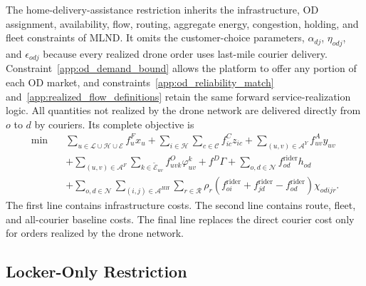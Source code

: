 \documentclass[final,3p,authoryear]{elsarticle}
\begin{document}
The home-delivery-assistance restriction inherits the infrastructure, OD assignment, availability, flow, routing, aggregate energy, congestion, holding, and fleet constraints of MLND.
It omits the customer-choice parameters, $\alpha_{dj}$, $\eta_{odj}$, and $\epsilon_{odj}$ because every realized drone order uses last-mile courier delivery.
Constraint~\eqref{app:od_demand_bound} allows the platform to offer any portion of each OD market, and constraints~\eqref{app:od_reliability_match} and~\eqref{app:realized_flow_definitions} retain the same forward service-realization logic.
All quantities not realized by the drone network are delivered directly from $o$ to $d$ by couriers.
Its complete objective is
\begin{align}
\min\quad
&
\sum_{u\in\mathcal L\cup\mathcal H\cup\mathcal E}f_u^{F}x_u
+
\sum_{i\in\mathcal H}\sum_{c\in\mathcal C}f_{ic}^{C}z_{ic}
+
\sum_{(u,v)\in\mathcal A^{Y}}f_{uv}^{A}y_{uv}
\nonumber\\
&+
\sum_{(u,v)\in\mathcal A^{F}}
\sum_{k\in\widetilde{\mathcal E}_{uv}}
f_{uvk}^{O}\varphi_{uv}^{k}
+f^{D}\Gamma
+
\sum_{o,d\in\mathcal N}f_{od}^{\mathrm{rider}}h_{od}
\nonumber\\
&+
\sum_{o,d\in\mathcal N}
\sum_{(i,j)\in\mathcal A^{HH}}
\sum_{r\in\mathcal R}
\rho_r
\left(
f_{oi}^{\mathrm{rider}}
+f_{jd}^{\mathrm{rider}}
-f_{od}^{\mathrm{rider}}
\right)
\chi_{odijr}.
\label{app:hd_objective}
\end{align}
The first line contains infrastructure costs.
The second line contains route, fleet, and all-courier baseline costs.
The final line replaces the direct courier cost only for orders realized by the drone network.

\clearpage
\subsection{Locker-Only Restriction}
\label{app:lo_model}
\end{document}

